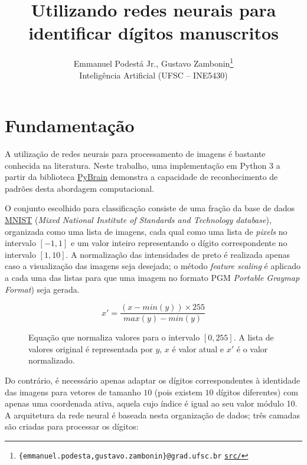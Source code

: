 \documentclass{article}
\title{\textbf{Utilizando redes neurais para identificar dígitos manuscritos}}
\author{Emmanuel Podestá Jr., Gustavo Zambonin\thanks{
        \texttt{\{emmanuel.podesta,gustavo.zambonin\}@grad.ufsc.br} \hfill
        \texttt{\href{https://github.com/zambonin/ufsc-ine5430}{src/}}
    } \\
    \small{Inteligência Artificial (UFSC -- INE5430)}
}
\date{}
\begin{document}
\maketitle

\section{Fundamentação}

A utilização de redes neurais para processamento de imagens é bastante conhecida
na literatura. Neste trabalho, uma implementação em Python 3 a partir da
biblioteca \href{http://pybrain.org/}{PyBrain} demonstra a capacidade de
reconhecimento de padrões desta abordagem computacional. \medskip

O conjunto escolhido para classificação consiste de uma fração da base de dados
\href{http://yann.lecun.com/exdb/mnist/}{MNIST} (\emph{Mixed National Institute
of Standards and Technology database}), organizada como uma lista de imagens,
cada qual como uma lista de \emph{pixels} no intervalo $[-1, 1]$ e um valor
inteiro representando o dígito correspondente no intervalo $[1, 10]$. A
normalização das intensidades de preto é realizada apenas caso a visualização
das imagens seja desejada; o método \emph{feature scaling} é aplicado a cada uma
das listas para que uma imagem no formato PGM \emph{{Portable Graymap Format}})
seja gerada.

\begin{figure}[htbp]
    \[ x' = \frac{(x - min(y)) \times 255}{max(y) - min(y)} \] \vspace{-5mm}
    \caption{Equação que normaliza valores para o intervalo $[0, 255]$. A
    lista de valores original é representada por $y$, $x$ é valor atual
    e $x'$ é o valor normalizado.}
\end{figure}

Do contrário, é necessário apenas adaptar os dígitos correspondentes à
identidade das imagens para vetores de tamanho $10$ (pois existem $10$ dígitos
diferentes) com apenas uma coordenada ativa, aquela cujo índice é igual ao seu
valor módulo 10. A arquitetura da rede neural é baseada nesta organização de
dados; três camadas são criadas para processar os dígitos:
\end{document}
